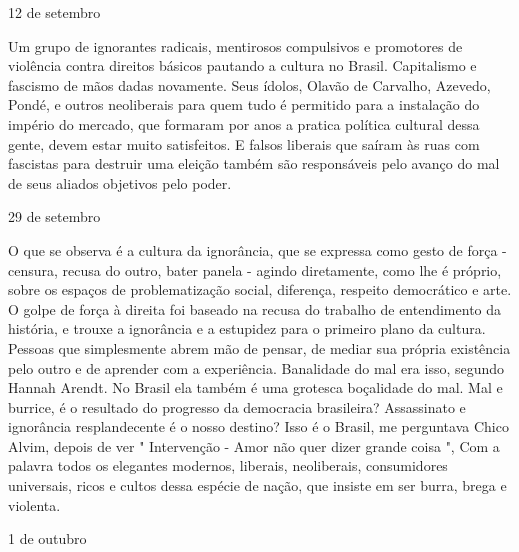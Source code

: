 \begin{flushright}
12 de setembro
\end{flushright}

Um grupo de ignorantes radicais, mentirosos compulsivos e promotores de
violência contra direitos básicos pautando a cultura no Brasil.
Capitalismo e fascismo de mãos dadas novamente. Seus ídolos, Olavão de
Carvalho, Azevedo, Pondé, e outros neoliberais para quem tudo é
permitido para a instalação do império do mercado, que formaram por anos
a pratica política cultural dessa gente, devem estar muito satisfeitos.
E falsos liberais que saíram às ruas com fascistas para destruir uma
eleição também são responsáveis pelo avanço do mal de seus aliados
objetivos pelo poder.

\begin{flushright}
29 de setembro
\end{flushright}

O que se observa é a cultura da ignorância, que se expressa como gesto
de força - censura, recusa do outro, bater panela - agindo diretamente,
como lhe é próprio, sobre os espaços de problematização social,
diferença, respeito democrático e arte. O golpe de força à direita foi
baseado na recusa do trabalho de entendimento da história, e trouxe a
ignorância e a estupidez para o primeiro plano da cultura. Pessoas que
simplesmente abrem mão de pensar, de mediar sua própria existência pelo
outro e de aprender com a experiência. Banalidade do mal era isso,
segundo Hannah Arendt. No Brasil ela também é uma grotesca boçalidade do
mal. Mal e burrice, é o resultado do progresso da democracia brasileira?
Assassinato e ignorância resplandecente é o nosso destino? Isso é o
Brasil, me perguntava Chico Alvim, depois de ver " Intervenção - Amor
não quer dizer grande coisa ", Com a palavra todos os elegantes
modernos, liberais, neoliberais, consumidores universais, ricos e cultos
dessa espécie de nação, que insiste em ser burra, brega e violenta.

\begin{flushright}
1 de outubro
\end{flushright}

